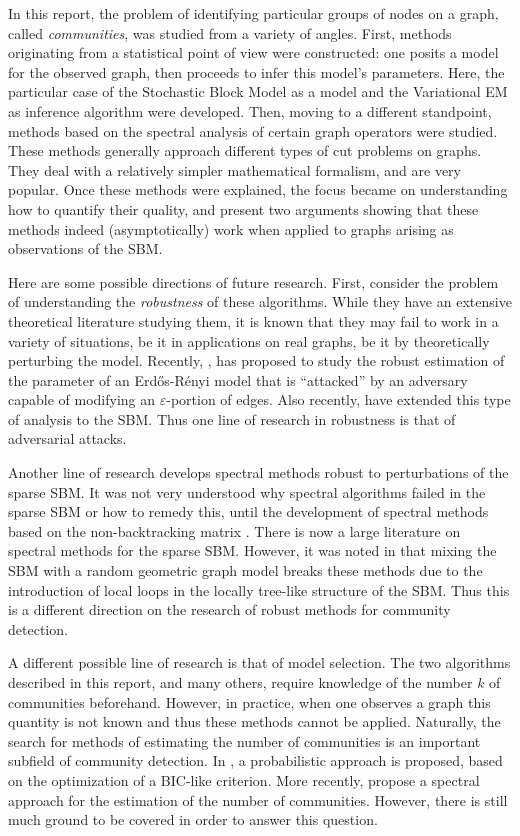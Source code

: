 \documentclass[../../main.tex]{subfiles} %
\begin{document}
In this report, the problem of identifying particular groups of nodes on a graph, 
called \textit{communities}, was studied from a variety of angles. First, methods 
originating from a statistical point of view were constructed: one posits a model for 
the observed graph, then proceeds to infer this model's parameters. Here, the 
particular case of the Stochastic Block Model as a model and the Variational EM as 
inference algorithm were developed. Then, moving to a different standpoint, 
methods based on the spectral analysis of certain graph operators were studied. 
These methods generally approach different types of cut problems on graphs. They 
deal with a relatively simpler mathematical formalism, and are very popular. Once 
these methods were explained, the focus became on understanding how to quantify 
their quality, and present two arguments showing that these methods indeed 
(asymptotically) work when applied to graphs arising as observations of the SBM.

Here are some possible directions of future research. First, consider the problem of 
understanding the \textit{robustness} of these algorithms. While they have an 
extensive theoretical literature studying them, it is known that they may fail to work 
in a variety of situations, be it in applications on real graphs, be it by theoretically 
perturbing the model. Recently, \cite{acharya__2022}, has proposed to study the 
robust estimation of the parameter of an Erd\H{o}s-Rényi model that is ``attacked'' 
by an adversary capable of modifying an \(\varepsilon\)-portion of edges. Also 
recently, \cite{liu__2022} have extended this type of analysis to the SBM. Thus one 
line of research in robustness is that of adversarial attacks.

Another line of research develops spectral methods robust to perturbations of the 
sparse SBM. It was not very understood why spectral algorithms failed in the sparse 
SBM or how to remedy this, until the development of spectral methods based on the 
non-backtracking matrix \cite{abbe_community_2017}. There is now a large 
literature on spectral methods for the sparse SBM. However, it was noted in 
\cite{abbe_graph_2020} that mixing the SBM with a random geometric graph model 
breaks these methods due to the introduction of local loops in the locally tree-like 
structure of the SBM. Thus this is a different direction on the research of robust 
methods for community detection.

A different possible line of research is that of model selection. The two algorithms 
described in this report, and many others, require knowledge of the number \(k\) of 
communities beforehand. However, in practice, when one 
observes a graph this quantity is not known and thus these methods cannot be 
applied. Naturally, the search for methods of estimating the number of communities 
is an important subfield of community detection. In 
\cite{wang_likelihood-based_2016}, a probabilistic approach is proposed, based on 
the optimization of a BIC-like criterion. More recently, \cite{le_estimating_2019} 
propose a spectral approach for the estimation of the number of communities. 
However, there is still much ground to be covered in order to answer this question.
\end{document}
